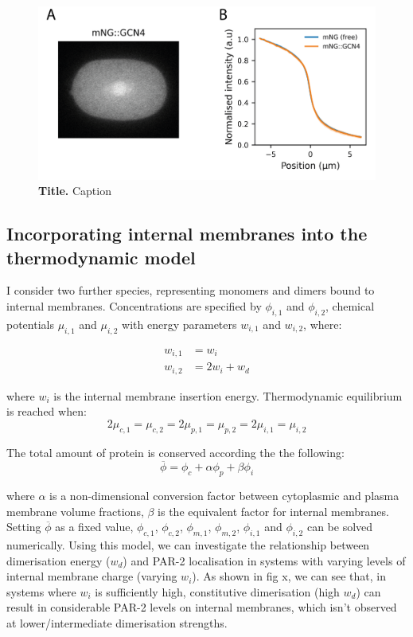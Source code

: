 \documentclass[12pt]{"article"}
\newcommand{\mycaption}[2]{\caption[#1]{\textbf{#1.} #2}}
\begin{document}
\begin{figure}[!h]
\includegraphics[scale=1]{gcn4_alone}
\setlength{\abovecaptionskip}{20pt}
\centering
\mycaption{Title}{Caption}
\end{figure}

\clearpage
\subsection{Incorporating internal membranes into the thermodynamic model}

I consider two further species, representing monomers and dimers bound to internal membranes.  Concentrations are specified by $\phi_{i,1}$ and $\phi_{i,2}$, chemical potentials $\mu_{i,1}$ and $\mu_{i,2}$ with energy parameters $w_{i,1}$ and $w_{i,2}$, where:

\begin{align}
w_{i,1} &= w_i\\
w_{i,2} &= 2w_i + w_d
\end{align}

where $w_i$ is the internal membrane insertion energy. Thermodynamic equilibrium is reached when:
\begin{equation}
2\mu_{c,1} =  \mu_{c,2} = 2\mu_{p,1} =  \mu_{p,2} = 2\mu_{i,1} =  \mu_{i,2}
\end{equation}

The total amount of protein is conserved according the the following:
\begin{equation}
\overline{\phi} = \phi_c + \alpha\phi_p + \beta\phi_i
\end{equation}

where $\alpha$ is a non-dimensional conversion factor between cytoplasmic and plasma membrane volume fractions, $\beta$ is the equivalent factor for internal membranes. Setting $\overline{\phi}$ as a fixed value, $\phi_{c,1}$, $\phi_{c,2}$, $\phi_{m,1}$, $\phi_{m,2}$, $\phi_{i,1}$ and $\phi_{i,2}$ can be solved numerically. Using this model, we can investigate the relationship between dimerisation energy ($w_d$) and PAR-2 localisation in systems with varying levels of internal membrane charge (varying $w_i$). As shown in fig x, we can see that, in systems where $w_i$ is sufficiently high, constitutive dimerisation (high $w_d$) can result in considerable PAR-2 levels on internal membranes, which isn't observed at lower/intermediate dimerisation strengths. 
\end{document}
